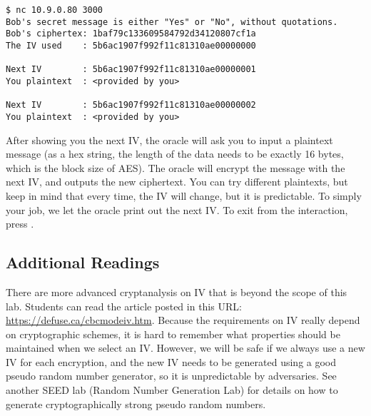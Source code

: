 \begin{lstlisting}
$ nc 10.9.0.80 3000
Bob's secret message is either "Yes" or "No", without quotations.
Bob's ciphertex: 1baf79c133609584792d34120807cf1a
The IV used    : 5b6ac1907f992f11c81310ae00000000

Next IV        : 5b6ac1907f992f11c81310ae00000001
You plaintext  : <provided by you>

Next IV        : 5b6ac1907f992f11c81310ae00000002
You plaintext  : <provided by you>
\end{lstlisting}

After showing you the next IV, 
the oracle will ask you to input a plaintext message (as a hex string, the 
length of the data needs to be exactly 16 bytes, which is the block size of AES).
The oracle will encrypt the message with the next IV, 
and outputs the new ciphertext.
You can try different plaintexts, but keep in mind that every time, the 
IV will change, but it is predictable. To simply your job, we let the 
oracle print out the next IV. To exit from the interaction, press .





\subsection{Additional Readings}

There are more advanced cryptanalysis on IV that is beyond the scope of this lab. Students
can read the article posted in this URL: \url{https://defuse.ca/cbcmodeiv.htm}.
Because the requirements on IV really depend on cryptographic schemes, it is hard to
remember what properties should be maintained when we select an IV.
However, we will be safe if we always use a new IV for each encryption, and the
new IV needs to be generated using a good pseudo random number
generator, so it is unpredictable by adversaries.
See another SEED lab (Random Number Generation Lab) for
details on how to generate cryptographically strong pseudo random numbers.

